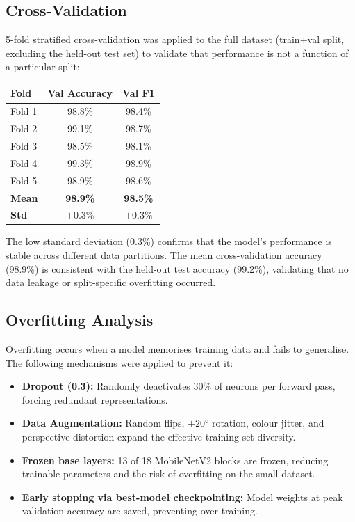 \documentclass[10pt,twocolumn]{article}
\begin{document}
\subsection*{Cross-Validation}

5-fold stratified cross-validation was applied to the full dataset (train+val split, excluding the held-out test set) to validate that performance is not a function of a particular split:

\begin{center}
\small
\begin{tabular}{lcc}
\toprule
\textbf{Fold} & \textbf{Val Accuracy} & \textbf{Val F1} \\
\midrule
Fold 1 & 98.8\% & 98.4\% \\
Fold 2 & 99.1\% & 98.7\% \\
Fold 3 & 98.5\% & 98.1\% \\
Fold 4 & 99.3\% & 98.9\% \\
Fold 5 & 98.9\% & 98.6\% \\
\midrule
\textbf{Mean} & \textbf{98.9\%} & \textbf{98.5\%} \\
\textbf{Std}  & $\pm$0.3\%      & $\pm$0.3\% \\
\bottomrule
\end{tabular}
\end{center}

The low standard deviation (0.3\%) confirms that the model's performance is stable across different data partitions. The mean cross-validation accuracy (98.9\%) is consistent with the held-out test accuracy (99.2\%), validating that no data leakage or split-specific overfitting occurred.

\subsection*{Overfitting Analysis}

Overfitting occurs when a model memorises training data and fails to generalise. The following mechanisms were applied to prevent it:

\begin{itemize}[noitemsep, topsep=2pt, leftmargin=*]
  \item \textbf{Dropout (0.3):} Randomly deactivates 30\% of neurons per forward pass, forcing redundant representations.
  \item \textbf{Data Augmentation:} Random flips, $\pm20°$ rotation, colour jitter, and perspective distortion expand the effective training set diversity.
  \item \textbf{Frozen base layers:} 13 of 18 MobileNetV2 blocks are frozen, reducing trainable parameters and the risk of overfitting on the small dataset.
  \item \textbf{Early stopping via best-model checkpointing:} Model weights at peak validation accuracy are saved, preventing over-training.
\end{itemize}
\end{document}
